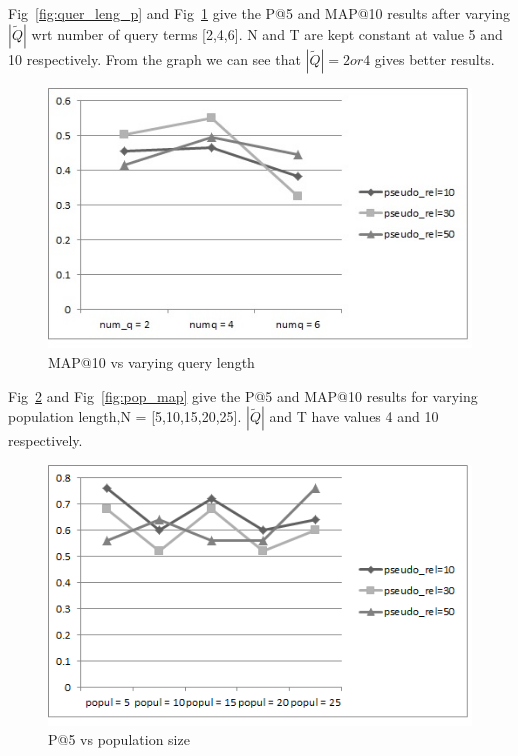 \documentclass{nitk}
\begin{document}
 Fig~\ref{fig:quer_leng_p} and Fig~\ref{fig:quer_leng_map} give the P@5 and MAP@10 results after varying $|\tilde{Q}|$ wrt number of query terms [2,4,6]. N and T are kept constant at value 5 and 10 respectively. From the graph we can see that $|\tilde{Q}| = 2 or 4$ gives better results. 
 \begin{figure}[!htb]
 \centering
 \includegraphics[scale=0.5]{query_length_map_10}
 \caption{MAP@10 vs varying query length}
 \label{fig:quer_leng_map} 
 \end{figure}
 Fig~\ref{fig:pop_p} and Fig~\ref{fig:pop_map} give the P@5 and MAP@10 results for varying population length,N = [5,10,15,20,25]. $|\tilde{Q}|$ and T have values 4 and 10 respectively.
 \begin{figure}[!htb]
 \centering
 \includegraphics[scale=0.5]{population_p_5}
 \caption{P@5 vs population size}
 \label{fig:pop_p}
 \end{figure}
\end{document}
